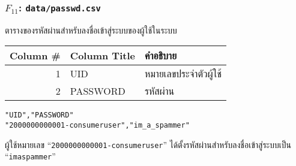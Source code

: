 \begin{minipage}{\textwidth}
\subsubsection[\texttt{data/passwd.csv}]{\texorpdfstring{$ F_{11} $}{File \#11}: \texttt{data/passwd.csv}}\label{subsubsec:csv-f11}

ตารางของรหัสผ่านสำหรับลงชื่อเข้าสู่ระบบของผู้ใช้ในระบบ

\begin{tabular}[!hbt]{| r | >{\ttfamily}p{15ex}<{\rmfamily} | p{36ex} |}
\hline
Column \#       & \rmfamily Column Title                & คำอธิบาย\\
\hline
1               & UID                                   & หมายเลขประจำตัวผู้ใช้\\
2               & PASSWORD                              & รหัสผ่าน\\
\hline
\end{tabular}


\begin{lstlisting}[caption={\texttt{data/passwd.csv}}]
"UID","PASSWORD"
"2000000000001-consumeruser","im_a_spammer"
\end{lstlisting}

\begin{description}[labelwidth=*]
    \item[$ \Rightarrow $] ผู้ใช้หมายเลข ``\texttt{2000000000001-consumeruser}''
ได้ตั้งรหัสผ่านสำหรับลงชื่อเข้าสู่ระบบเป็น ``\texttt{im\textunderscore{}a\textunderscore{}spammer}''
\end{description}
\end{minipage}


\vspace{3\baselineskip}


